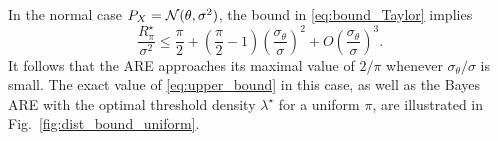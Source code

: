 \begin{example} \label{ex:bound}
In the normal case $P_X = \mathcal{N}(\theta, \sigma^2)$, the bound in \eqref{eq:bound_Taylor} implies 
\[
\frac{R^\star_\pi}{\sigma^2}  \leq \frac{\pi}{2} + \left( \frac{\pi}{2} -1 \right) \left( \frac{ \sigma_\theta}{\sigma} \right)^2 + O \left(  \frac{\sigma_\theta} { \sigma} \right)^3. 
\]
It follows that the ARE approaches its maximal value of $2/\pi$ whenever $\sigma_\theta/\sigma$ is small. The exact value of \eqref{eq:upper_bound} in this case, as well as the Bayes ARE with the optimal threshold density $\lambda^\star$ for a uniform $\pi$, are illustrated in Fig.~\ref{fig:dist_bound_uniform}. 
\end{example}
